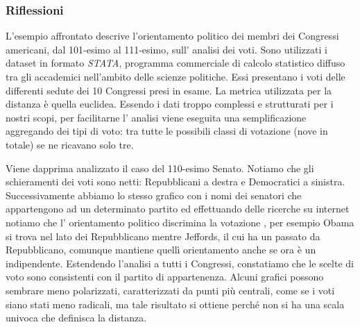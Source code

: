 			\subsubsection{Riflessioni }		
				L'esempio affrontato descrive l'orientamento politico dei membri dei Congressi americani, dal 101-esimo al 111-esimo, sull' analisi dei voti.
				Sono utilizzati i dataset in formato \emph{STATA}, programma commerciale di calcolo statistico diffuso tra gli accademici nell'ambito delle scienze politiche. Essi presentano i voti delle differenti sedute dei 10 Congressi presi in esame. 
				La metrica utilizzata per la distanza è quella euclidea.
				Essendo i dati troppo complessi e strutturati per i nostri scopi, per facilitarne l' analisi viene eseguita una semplificazione aggregando dei tipi di voto: tra tutte le possibili classi di votazione (nove in totale) se ne ricavano solo tre.\par
				Viene dapprima analizzato il caso del 110-esimo Senato. Notiamo che gli schieramenti dei voti sono netti: Repubblicani a destra e Democratici a sinistra.
				Successivamente abbiamo lo stesso grafico con i nomi dei senatori che appartengono ad un determinato partito ed effettuando delle ricerche su internet notiamo che l' orientamento politico discrimina la votazione , per esempio Obama si trova nel lato dei Repubblicano mentre Jeffords, il cui ha un passato da Repubblicano, comunque mantiene quellì orientamento anche se ora è un indipendente.
				Estendendo l'analisi a tutti i Congressi, constatiamo che le scelte di voto sono consistenti con il partito di appartenenza. Alcuni grafici possono sembrare meno polarizzati, caratterizzati da punti più centrali, come se i voti siano stati meno radicali, ma tale risultato si ottiene perché non si ha una scala univoca che definisca la distanza.
